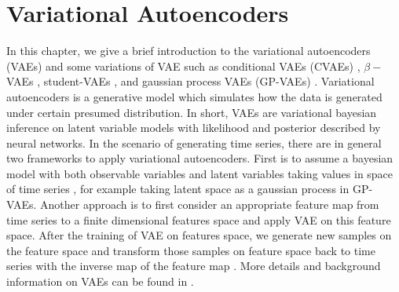 \documentclass[12pt]{report}
\theoremstyle{definition}
\theoremstyle{remark}
\begin{document}
  
\chapter{Variational Autoencoders}
In this chapter, we give a brief introduction to the variational autoencoders (VAEs) \cite{kingma2013auto} and some variations of VAE such as conditional VAEs (CVAEs) \cite{sohn2015learning}, $\beta-$VAEs \cite{higgins2016beta}, student-VAEs \cite{abiri2020variational}, and gaussian process VAEs (GP-VAEs) \cite{fortuin2020gp}. Variational autoencoders is a generative model which simulates how the data is generated under certain presumed distribution. In short, VAEs are variational bayesian inference on latent variable models with likelihood and posterior described by neural networks. In the scenario of generating time series, there are in general two frameworks to apply variational autoencoders. First is to assume a bayesian model with both observable variables and latent variables taking values in space of time series \cite{fortuin2020gp} \cite{toth2020seq2tens}, for example taking latent space as a gaussian process in GP-VAEs. Another approach is to first consider an appropriate feature map from time series to a finite dimensional features space and apply VAE on this feature space. After the training of VAE on features space, we generate new samples on the feature space and transform those samples on feature space back to time series with the inverse map of the feature map \cite{buehler2020data}. More details and background information on VAEs can be found in \cite{kingma2019introduction}.
\end{document}
